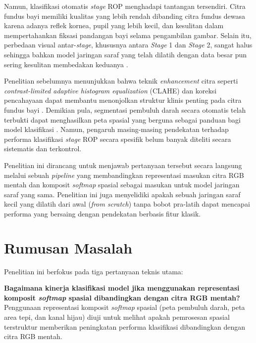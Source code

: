 Namun, klasifikasi otomatis \textit{stage} ROP menghadapi tantangan tersendiri. Citra fundus
bayi memiliki kualitas yang lebih rendah dibanding citra fundus dewasa karena adanya reflek
kornea, pupil yang lebih kecil, dan kesulitan dalam mempertahankan fiksasi pandangan bayi
selama pengambilan gambar. Selain itu, perbedaan visual antar-\textit{stage}, khususnya antara
\textit{Stage} 1 dan \textit{Stage} 2, sangat halus sehingga bahkan model jaringan saraf yang
telah dilatih dengan data besar pun sering kesulitan membedakan keduanya \citep{Zhao2024}.

Penelitian sebelumnya menunjukkan bahwa teknik \textit{enhancement} citra seperti
\textit{contrast-limited adaptive histogram equalization} (CLAHE) dan koreksi pencahayaan dapat
membantu menonjolkan struktur klinis penting pada citra fundus bayi \citep{Rahim2024}.
Demikian pula, segmentasi pembuluh darah secara otomatis telah terbukti dapat menghasilkan
peta spasial yang berguna sebagai panduan bagi model klasifikasi \citep{Almeida2024}. Namun,
pengaruh masing-masing pendekatan terhadap performa klasifikasi \textit{stage} ROP secara
spesifik belum banyak diteliti secara sistematis dan terkontrol.

Penelitian ini dirancang untuk menjawab pertanyaan tersebut secara langsung melalui sebuah
\textit{pipeline} yang membandingkan representasi masukan citra RGB mentah dan komposit \textit{softmap} spasial sebagai masukan untuk model jaringan saraf yang sama. Penelitian ini juga menyelidiki apakah sebuah jaringan
saraf kecil yang dilatih dari awal (\textit{from scratch}) tanpa bobot pra-latih dapat
mencapai performa yang bersaing dengan pendekatan berbasis fitur klasik.

\section{Rumusan Masalah}

Penelitian ini berfokus pada tiga pertanyaan teknis utama:

\vspace{2mm}
\noindent\textbf{Bagaimana kinerja klasifikasi model jika menggunakan representasi komposit \textit{softmap} spasial dibandingkan dengan citra RGB mentah?}
Penggunaan representasi komposit \textit{softmap} spasial (peta pembuluh darah, peta area tepi, dan kanal hijau) diuji untuk melihat apakah pemrosesan spasial terstruktur memberikan peningkatan performa klasifikasi dibandingkan dengan citra RGB mentah.

